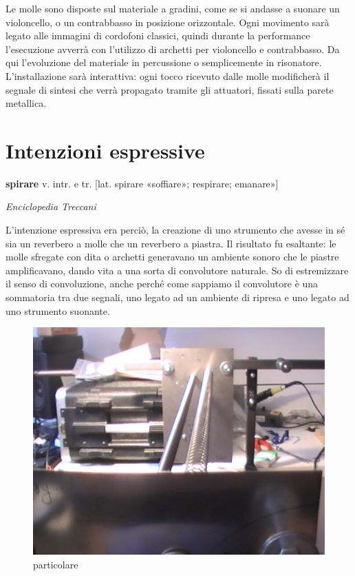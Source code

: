 Le molle sono disposte sul materiale a gradini, come se si andasse a suonare un violoncello, o un contrabbasso in posizione orizzontale. 
Ogni movimento sarà legato alle immagini di cordofoni classici, quindi durante la performance l'esecuzione avverrà con l'utilizzo di archetti per violoncello e contrabbasso. Da qui l'evoluzione del materiale in percussione o semplicemente in risonatore. 
L'installazione sarà interattiva: ogni tocco ricevuto dalle molle modificherà il segnale di sintesi che verrà propagato tramite gli attuatori, fissati sulla parete metallica.


\section{Intenzioni espressive}
\epigraph{\textbf{spirare} v. intr. e tr. [lat. spirare «soffiare»; respirare; emanare»]}
{\textit{Enciclopedia Treccani}}

L'intenzione espressiva era perciò, la creazione di uno strumento che avesse in sé sia un reverbero a molle che un reverbero a piastra. Il risultato fu esaltante: le molle sfregate con dita o archetti generavano un ambiente sonoro che le piastre amplificavano, dando vita a una sorta di convolutore naturale. So di estremizzare il senso di convoluzione, anche perché come sappiamo il convolutore è una sommatoria tra due segnali, uno legato ad un ambiente di ripresa e uno legato ad uno strumento suonante.


\begin{figure}[htbp]
\begin{center}
\includegraphics[]{../Graphics/Prototipo3.jpg}
\caption{particolare}
\label{default}
\end{center}
\end{figure}

